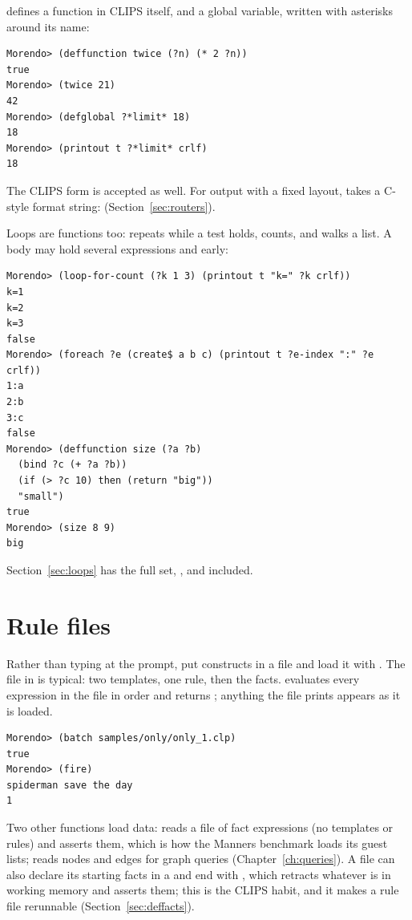  defines a function in CLIPS itself, and  a
global variable, written with asterisks around its name:

\begin{lstlisting}[style=shell]
Morendo> (deffunction twice (?n) (* 2 ?n))
true
Morendo> (twice 21)
42
Morendo> (defglobal ?*limit* 18)
18
Morendo> (printout t ?*limit* crlf)
18
\end{lstlisting}

The CLIPS form  is accepted as well.
For output with a fixed layout,  takes a C-style format
string: 
(Section~\ref{sec:routers}).

Loops are functions too:  repeats while a test holds,
 counts, and  walks a list. A
 body may hold several expressions and 
early:

\begin{lstlisting}[style=shell]
Morendo> (loop-for-count (?k 1 3) (printout t "k=" ?k crlf))
k=1
k=2
k=3
false
Morendo> (foreach ?e (create$ a b c) (printout t ?e-index ":" ?e crlf))
1:a
2:b
3:c
false
Morendo> (deffunction size (?a ?b)
  (bind ?c (+ ?a ?b))
  (if (> ?c 10) then (return "big"))
  "small")
true
Morendo> (size 8 9)
big
\end{lstlisting}

Section~\ref{sec:loops} has the full set, ,  and
 included.

\section{Rule files}

Rather than typing at the prompt, put constructs in a file and load it
with . The file  in 
is typical: two templates, one rule, then the facts.  evaluates every
expression in the file in order and returns ; anything the file
prints appears as it is loaded.

\begin{lstlisting}[style=shell]
Morendo> (batch samples/only/only_1.clp)
true
Morendo> (fire)
spiderman save the day
1
\end{lstlisting}

Two other functions load data:  reads a file of fact
expressions (no templates or rules) and asserts them, which is how the
Manners benchmark loads its guest lists;  reads nodes and
edges for graph queries (Chapter~\ref{ch:queries}). A file can also
declare its starting facts in a  and end with ,
which retracts whatever is in working memory and asserts them; this is
the CLIPS habit, and it makes a rule file rerunnable
(Section~\ref{sec:deffacts}).

